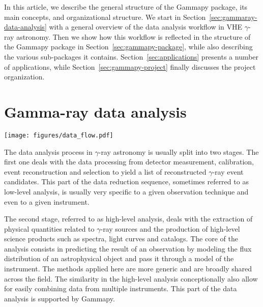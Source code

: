 \documentclass[longauth]{aa}
\newcommand{\code}[1]{\texttt{#1}}
\newcommand{\gammapy}{Gammapy\xspace}
\newcommand{\gammaray}{$\gamma$-ray\xspace}
\begin{document}
In this article, we describe the general structure of the \gammapy package,
its main concepts, and organizational structure. We start in
Section~\ref{sec:gammaray-data-analysis} with a general overview
of the data analysis workflow in VHE \gammaray astronomy. Then we
show how this workflow is reflected in the structure of the \gammapy package 
in Section~\ref{sec:gammapy-package}, while also
describing the various sub-packages it contains. Section~\ref{sec:applications}
presents a number of applications, while Section~\ref{sec:gammapy-project}
finally discusses the project organization.


\section{Gamma-ray data analysis}
\begin{figure*}[t]
        \centering
        \texttt{[image: figures/data\_flow.pdf]}
        \caption{
                \gammapy sub-package structure and data analysis workflow. The top row
        defines the different levels of data reduction, from lists of \gammaray-like
        events on the left (DL3), to high-level scientific products
        (DL5) on the right. The direction of the data flow is illustrated with the
        gray arrows. The gray folder icons represent the different sub-packages
        in \gammapy and names given as the corresponding Python code suffix, e.g., 
                \code{gammapy.data}. Below each icon there is a list of the most
        important objects defined in the sub-package. The light gray folder
                icons show the sub-packages for the most fundamental data structures such 
                as maps and IRFs. The bottom of the figure shows the high-level analysis
                sub-module with its dependency on the YAML file format. 
    }
        \label{fig:data_flow}
\end{figure*}
%
\label{sec:gammaray-data-analysis}
The data analysis process in \gammaray astronomy is usually split into two stages.
The first one deals with the data processing from detector measurement, calibration, event
reconstruction and selection to yield a list of reconstructed \gammaray event candidates.
This part of the data reduction sequence, sometimes referred to as low-level analysis,
is usually very specific to a given observation technique and even to a given instrument.

The second stage, referred to as high-level analysis, deals with the extraction of physical
quantities related to \gammaray sources and the production of high-level science products
such as spectra, light curves and catalogs. The core of the analysis consists in predicting
the result of an observation by modeling the flux distribution of an astrophysical
object and pass it through a model of the instrument. The methods applied here are more
generic and are broadly shared across the field. The similarity in the high-level
analysis conceptionally also allow for easily combining data from multiple instruments.
This part of the data analysis is supported by \gammapy. 
\end{document}

